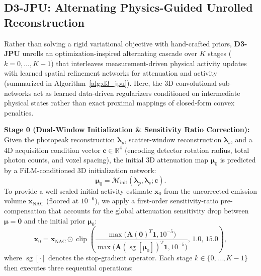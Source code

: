 \documentclass[11pt, a4paper]{article}
\begin{document}
\subsection{D3-JPU: Alternating Physics-Guided Unrolled Reconstruction}
Rather than solving a rigid variational objective with hand-crafted priors, \textbf{D3-JPU} unrolls an optimization-inspired alternating cascade over $K$ stages ($k = 0, \dots, K-1$) that interleaves measurement-driven physical activity updates with learned spatial refinement networks for attenuation and activity (summarized in Algorithm~\ref{alg:d3_jpu}). Here, the 3D convolutional sub-networks act as learned data-driven regularizers conditioned on intermediate physical states rather than exact proximal mappings of closed-form convex penalties.

\textbf{Stage 0 (Dual-Window Initialization \& Sensitivity Ratio Correction):} Given the photopeak reconstruction $\boldsymbol{\lambda}_p$, scatter-window reconstruction $\boldsymbol{\lambda}_s$, and a 4D acquisition condition vector $\mathbf{c} \in \mathbb{R}^4$ (encoding detector rotation radius, total photon counts, and voxel spacing), the initial 3D attenuation map $\boldsymbol{\mu}_0$ is predicted by a FiLM-conditioned \cite{ref30} 3D initialization network:
\begin{equation}
\boldsymbol{\mu}_0 = \mathcal{M}_{\text{init}}(\boldsymbol{\lambda}_p, \boldsymbol{\lambda}_s; \mathbf{c}).
\end{equation}
To provide a well-scaled initial activity estimate $\mathbf{x}_0$ from the uncorrected emission volume $\mathbf{x}_{\text{NAC}}$ (floored at $10^{-6}$), we apply a first-order sensitivity-ratio pre-compensation that accounts for the global attenuation sensitivity drop between $\boldsymbol{\mu} = \mathbf{0}$ and the initial prior $\boldsymbol{\mu}_0$:
\begin{equation}
\mathbf{x}_0 = \mathbf{x}_{\text{NAC}} \odot \operatorname{clip}\!\left( \frac{\max\big(\mathbf{A}(\mathbf{0})^T \mathbf{1}, 10^{-5}\big)}{\max\big(\mathbf{A}(\operatorname{sg}[\boldsymbol{\mu}_0])^T \mathbf{1}, 10^{-5}\big)}, \, 1.0, \, 15.0 \right),
\end{equation}
where $\operatorname{sg}[\cdot]$ denotes the stop-gradient operator. Each stage $k \in \{0, \dots, K-1\}$ then executes three sequential operations:
\end{document}
